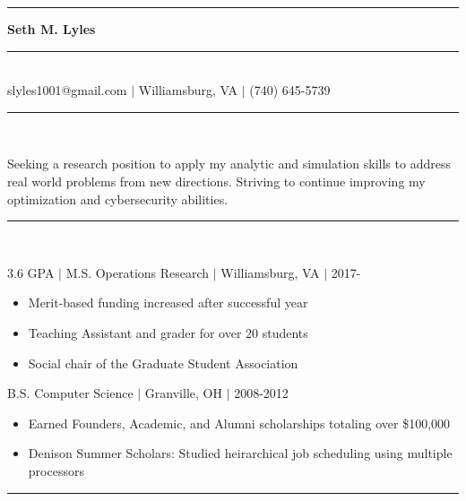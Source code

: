 \documentclass[11pt]{article}
\begin{document}
\begin{center}
\noindent\rule[5pt]{173pt}{.4pt}\LARGE\bf{ Seth M. Lyles }\rule[5pt]{173pt}{.4pt}\\ %
{\large slyles1001@gmail.com $|$ Williamsburg, VA $|$ (740) 645-5739}
\end{center}
\vspace{8pt}
\hrule\vspace{10pt}
\\
\vspace{-8pt}

\noindent Seeking a research position to apply my analytic and simulation skills to address real world problems from new directions. Striving to continue improving my optimization and cybersecurity abilities.

\vspace{8pt}\hrule\vspace{10pt}
\\
\vspace{-8pt}

\hfill {3.6 GPA $|$ M.S. Operations Research $|$ Williamsburg, VA $|$ 2017-}

\begin{itemize}
\item Merit-based funding increased after successful year
\item Teaching Assistant and grader for over 20 students
\item Social chair of the Graduate Student Association
\end{itemize}

\hfill { B.S. Computer Science $|$ Granville, OH $|$ 2008-2012}

\begin{itemize}
\item Earned Founders, Academic, and Alumni scholarships totaling over \$100,000
\item Denison Summer Scholars: Studied heirarchical job scheduling using multiple processors
\end{itemize}

\vspace{8pt}\hrule\vspace{10pt}
\\
\vspace{-8pt}
\end{document}
